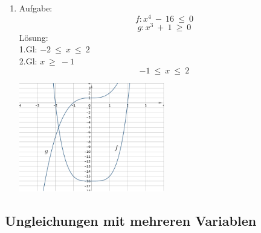 \begin{enumerate}
\begin{center}
					\end{center}
	\item Aufgabe:
					\[f : x^4 \ - \ 16 \ \leq \ 0\]
					\[g : x^3 \ + \ 1 \ \geq \ 0\]
				L\"osung: \\
					1.Gl: $ -2 \ \leq \ x \ \leq \ 2 $ \\
					2.Gl: $ x  \ \geq \ -1 $ \\
					\[-1 \ \leq \ x \ \leq \ 2\]
					\begin{center}
						\includegraphics[width=0.5\textwidth]{img/Aufgaben/Analytisch/A16.PNG}
					\end{center}
\end{enumerate}

\subsection{Ungleichungen mit mehreren Variablen}

